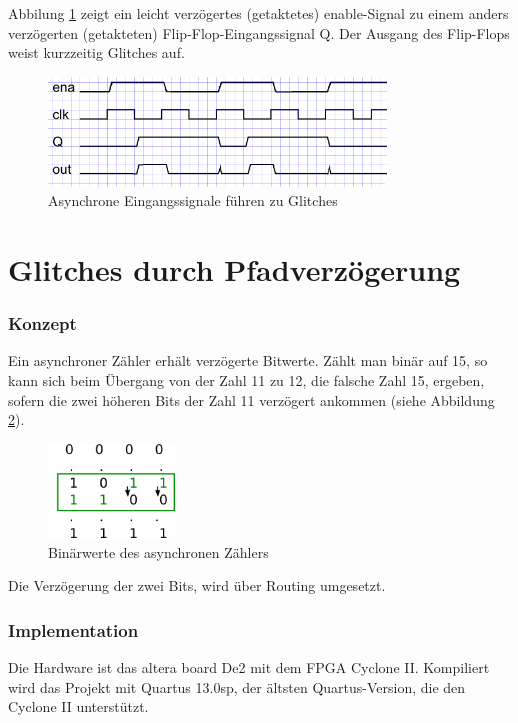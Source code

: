Abbilung \ref{fig.glitch.bild1} zeigt ein leicht verzögertes (getaktetes) enable-Signal zu einem anders verzögerten (getakteten) Flip-Flop-Eingangssignal Q. Der Ausgang des Flip-Flops weist kurzzeitig Glitches auf. \\
\begin{figure}[H]
	\centering
	\includegraphics[width=0.8\textwidth]{images/glitch/def_glitch_3.png}
	\caption{Asynchrone Eingangssignale führen zu Glitches}
	\label{fig.glitch.bild1}
\end{figure}


\newpage
\section{Glitches durch Pfadverzögerung}\label{sect.glitch_detect}


\subsubsection{Konzept}
Ein asynchroner Zähler erhält verzögerte Bitwerte. Zählt man binär auf 15, so kann sich beim Übergang von der Zahl 11 zu 12, die falsche Zahl 15, ergeben, sofern die zwei höheren Bits der Zahl 11 verzögert ankommen (siehe Abbildung \ref {fig.glitch.binaer_zahlen}).

\begin{figure}[H]
	\centering
	\includegraphics[width=0.3\textwidth]{images/glitch/konzept_verzoegerung.png}
	\caption{Binärwerte des asynchronen Zählers}
	\label{fig.glitch.binaer_zahlen}
\end{figure}

Die Verzögerung der zwei Bits, wird über Routing umgesetzt. 



\subsubsection{Implementation} 
Die Hardware ist das altera board De2 mit dem FPGA Cyclone II. Kompiliert wird das Projekt mit Quartus 13.0sp, der ältsten Quartus-Version, die den Cyclone II unterstützt.

